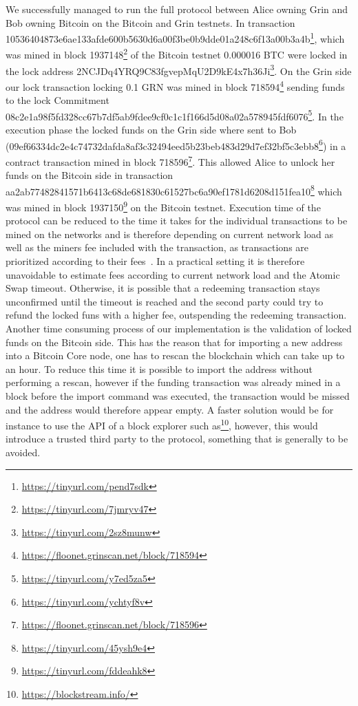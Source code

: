 We successfully managed to run the full protocol between Alice owning Grin and Bob owning Bitcoin on the Bitcoin and Grin testnets.
In transaction \\10536404873e6ae133afde600b5630d6a00f3be0b9dde01a248c6f13a00b3a4b\footnote{\url{https://tinyurl.com/pend7sdk}}, which was mined in block 1937148\footnote{\url{https://tinyurl.com/7jmryv47}} of the Bitcoin testnet 0.000016 BTC were locked in the lock address 2NCJDq4YRQ9C83fgvepMqU2D9kE4x7h36Ji\footnote{\url{https://tinyurl.com/2sz8munw}}.
On the Grin side our lock transaction locking 0.1 GRN was mined in block 718594\footnote{\url{https://floonet.grinscan.net/block/718594}} sending funds to the lock Commitment \\08c2e1a98f5fd328cc67b7df5ab9fdee9cf0c1c1f166d5d08a02a578945fdf6076\footnote{\url{https://tinyurl.com/y7ed5za5}}.
In the execution phase the locked funds on the Grin side where sent to Bob \\(09ef66334dc2e4c74732dafda8af3c32494eed5b23beb483d29d7ef32bf5c3ebb8\footnote{\url{https://tinyurl.com/ychtyf8v}}) in a contract transaction mined in block 718596\footnote{\url{https://floonet.grinscan.net/block/718596}}.
This allowed Alice to unlock her funds on the Bitcoin side in transaction \\ aa2ab77482841571b6413c68de681830c61527bc6a90ef1781d6208d151fea10\footnote{\url{https://tinyurl.com/45ysh9e4}} which was mined in block 1937150\footnote{\url{https://tinyurl.com/fddeahk8}} on the Bitcoin testnet.
Execution time of the protocol can be reduced to the time it takes for the individual transactions to be mined on the networks and is therefore depending on current network load as well as the miners fee included with the transaction, as transactions are prioritized according to their fees~\cite{kasahara2016effect}.
In a practical setting it is therefore unavoidable to estimate fees according to current network load and the Atomic Swap timeout.
Otherwise, it is possible that a redeeming transaction stays unconfirmed until the timeout is reached and the second party could try to refund the locked funs with a higher fee, outspending the redeeming transaction.
Another time consuming process of our implementation is the validation of locked funds on the Bitcoin side.
This has the reason that for importing a new address into a Bitcoin Core node, one has to rescan the blockchain which can take up to an hour.
To reduce this time it is possible to import the address without performing a rescan, however if the funding transaction was already mined in a block before the import command was executed, the transaction would be missed and the address would therefore appear empty.
A faster solution would be for instance to use the API of a block explorer such as\footnote{\url{https://blockstream.info/}}, however, this would introduce a trusted third party to the protocol, something that is generally to be avoided.
